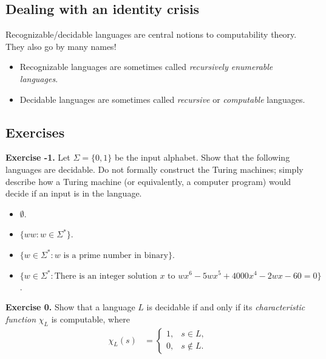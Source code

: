\documentclass[10pt]{article}
\begin{document}
\subsection*{Dealing with an identity crisis}
Recognizable/decidable languages are central notions to computability theory. They also go by many names!
\begin{itemize}
	\item Recognizable languages are sometimes called \textit{recursively enumerable languages}.
	\item Decidable languages are sometimes called \textit{recursive} or \textit{computable} languages.
\end{itemize}
\subsection*{Exercises}

\textbf{Exercise -1.} Let $\Sigma = \{0, 1\}$ be the input alphabet. Show that the following languages are decidable. Do not formally construct the Turing machines; simply describe how a Turing machine (or equivalently, a computer program) would decide if an input is in the language.

\begin{itemize}
	\item $\emptyset$.
	\item $\{ww: w \in \Sigma^*\}$.
	\item $\{w \in \Sigma^*: \text{$w$ is a prime number in binary}\}$.
	\item $\{w \in \Sigma^*: \text{There is an integer solution $x$ to $wx^6 - 5wx^5 + 4000x^4 - 2wx - 60 = 0$}\}$.
	\vspace{-3mm}
\end{itemize}

\noindent \hrulefill

\textbf{Exercise 0.} Show that a language $L$ is decidable if and only if its \textit{characteristic function} $\chi_L$ is computable, where
\begin{align*}
	\chi_L(s) &=
	\begin{cases}
		1, & s\in L,\\
		0, & s \notin L.
	\end{cases}
\end{align*}

\noindent \hrulefill
\end{document}

